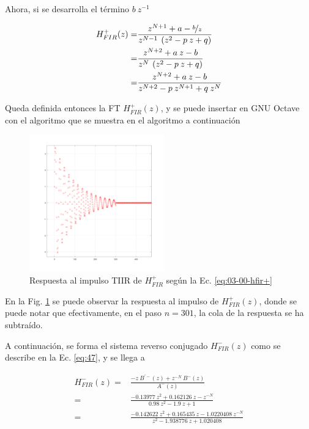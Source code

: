 \message{ !name(../main.tex)}\documentclass[journal,transmag]{IEEEtran}
\begin{document}
    Ahora, si se desarrolla el término $b \: z^{-1}$

    \begin{align}
      H_{FIR}^{+}(z) =& \frac{z^{N+1} + a - \nicefrac{b}{z}}{z^{N-1} \: \left( z^{2} - p \: z + q \right)} \nonumber \\
      =& \frac{z^{N+2} + a \: z - b}{z^{N} \: \left( z^{2} - p \: z + q \right)} \nonumber \\
      =& \frac{z^{N+2} + a \: z - b}{z^{N+2} - p \: z^{N+1} + q \: z^{N}}
      \label{eq:03-00-hfir+}
    \end{align}

    Queda definida entonces la FT $H_{FIR}^{+}(z)$, y se puede insertar en GNU Octave con el algoritmo que se muestra en el algoritmo a continuación

    

    \begin{figure}
      \centering
      \includegraphics[width=0.52\textwidth]{../images/03-00-hfir+.png}
      \caption{Respuesta al impulso TIIR de $H_{FIR}^{+}$ según la Ec. \ref{eq:03-00-hfir+}}
      \label{fig:03-00-hfir+}
    \end{figure}

    En la Fig. \ref{fig:03-00-hfir+} se puede observar la respuesta al impulso de $H_{FIR}^{+}(z)$, donde se puede notar que efectivamente, en el paso $n=301$, la cola de la respuesta se ha subtraído.

    A continuación, se forma el sistema reverso conjugado $H_{FIR}^{-}(z)$ como se describe en la Ec. \ref{eq:47}, y se llega a

    \begin{align}
      H_{FIR}^{-}(z) =& \frac{-z \: B^{\prime -}(z) + z^{-N} \: B^{-}(z)}{A^{-}(z)} \nonumber \\
      =& \frac{-0.13977 \: z^{2} + 0.162126 \: z - z^{-N}}{0.98 \: z^{2} - 1.9 \: z +1} \nonumber \\
      =& \frac{-0.142622 \: z^{2} + 0.165435 \: z - 1.0220408 \: z^{-N}}{z^{2} - 1.938776 \: z + 1.020408}
    \end{align}
\end{document}
